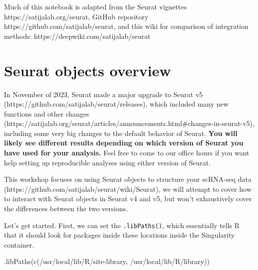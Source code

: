 \documentclass[
  letterpaper,
  DIV=11,
  numbers=noendperiod]{scrreprt}
\newenvironment{Shaded}{\begin{snugshade}}{\end{snugshade}}
\newcommand{\FunctionTok}[1]{\textcolor[rgb]{0.28,0.35,0.67}{#1}}
\newcommand{\NormalTok}[1]{\textcolor[rgb]{0.00,0.23,0.31}{#1}}
\newcommand{\StringTok}[1]{\textcolor[rgb]{0.13,0.47,0.30}{#1}}
\begin{document}
Much of this notebook is adapted from the Seurat vignettes
https://satijalab.org/seurat, GitHub repository
https://github.com/satijalab/seurat, and this wiki for comparison of
integration methods: https://deepwiki.com/satijalab/seurat

\section{Seurat objects overview}\label{seurat-objects-overview}

\begin{tcolorbox}[enhanced jigsaw, breakable, leftrule=.75mm, coltitle=black, toptitle=1mm, arc=.35mm, bottomtitle=1mm, title=\textcolor{quarto-callout-important-color}{\faExclamation}\hspace{0.5em}{Important}, rightrule=.15mm, colbacktitle=quarto-callout-important-color!10!white, opacitybacktitle=0.6, left=2mm, toprule=.15mm, colframe=quarto-callout-important-color-frame, opacityback=0, colback=white, titlerule=0mm, bottomrule=.15mm]

In November of 2023, Seurat made a major upgrade to Seurat v5
(https://github.com/satijalab/seurat/releases), which included many new
functions and other changes
(https://satijalab.org/seurat/articles/announcements.html\#changes-in-seurat-v5),
including some very big changes to the default behavior of Seurat.
\textbf{You will likely see different results depending on which version
of Seurat you have used for your analysis.} Feel free to come to our
office hours if you want help setting up reproducible analyses using
either version of Seurat.

\end{tcolorbox}

This workshop focuses on using Seurat objects to structure your
scRNA-seq data (https://github.com/satijalab/seurat/wiki/Seurat), we
will attempt to cover how to interact with Seurat objects in Seurat v4
and v5, but won't exhaustively cover the differences between the two
versions.

Let's get started. First, we can set the \texttt{.libPaths()}, which
essentially tells R that it should look for packages inside these
locations inside the Singularity container.

\begin{Shaded}
\begin{Highlighting}[]
\FunctionTok{.libPaths}\NormalTok{(}\FunctionTok{c}\NormalTok{(}\StringTok{\textquotesingle{}/usr/local/lib/R/site{-}library\textquotesingle{}}\NormalTok{, }\StringTok{\textquotesingle{}/usr/local/lib/R/library\textquotesingle{}}\NormalTok{))}
\end{Highlighting}
\end{Shaded}
\end{document}
